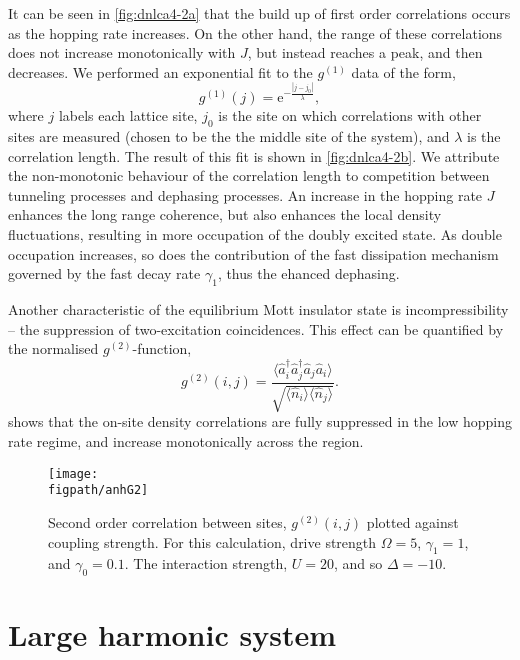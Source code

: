 It can be seen in \cref{fig:dnlca4-2a} that the build up of first order correlations occurs as the hopping rate increases. On the other hand, the range of these correlations does not increase monotonically with \(J\), but instead reaches a peak, and then decreases. We performed an exponential fit to the \(g^{(1)}\) data of the form,
\begin{equation}
	g^{(1)}(j) = \mathrm{e}^{-\frac{|j-j_{0}|}{\lambda}},
	\label{eq:dnlca4-2}
\end{equation}
where \(j\) labels each lattice site, \(j_{0}\) is the site on which correlations with other sites are measured (chosen to be the the middle site of the system), and \(\lambda\) is the correlation length. The result of this fit is shown in \cref{fig:dnlca4-2b}. We attribute the non-monotonic behaviour of the correlation length to competition between tunneling processes and dephasing processes. An increase in the hopping rate \(J\) enhances the long range coherence, but also enhances the local density fluctuations, resulting in more occupation of the doubly excited state. As double occupation increases, so does the contribution of the fast dissipation mechanism governed by the fast decay rate \(\gamma_{1}\), thus the ehanced dephasing.

Another characteristic of the equilibrium Mott insulator state is incompressibility -- the suppression of two-excitation coincidences. This effect can be quantified by the normalised \(g^{(2)}\)-function,
\begin{equation}
	g^{(2)}(i,j) = \frac{\langle \hat{a}_{i}^{\dagger}\hat{a}_{j}^{\dagger}\hat{a}_{j}\hat{a}_{i} \rangle}{\sqrt{\langle \hat{n}_{i} \rangle \langle \hat{n}_{j} \rangle}}.
	\label{eq:dnlca4-3}
\end{equation}
 shows that the on-site density correlations are fully suppressed in the low hopping rate regime, and increase monotonically across the region.

\begin{figure}[ht]
	\centering
	\texttt{[image: \\figpath/anhG2]}
	\caption{\label{fig:dnlca4-3} Second order correlation between sites, \(g^{(2)}(i,j)\) plotted against coupling strength. For this calculation, drive strength \(\Omega = 5\), \(\gamma_{1} = 1\), and \(\gamma_{0} = 0.1\). The interaction strength, \(U=20\), and so \(\Delta = -10\).}
\end{figure}

\section{Large harmonic system}


